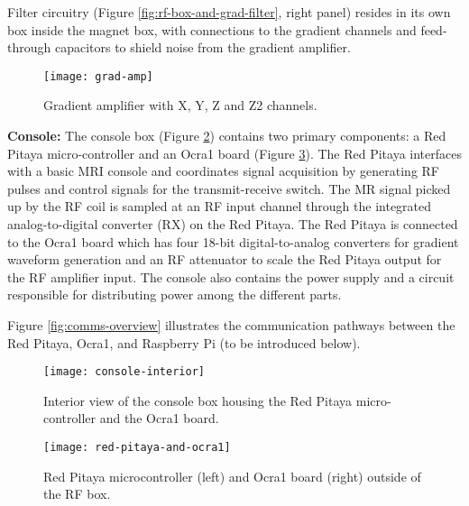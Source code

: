 Filter circuitry (Figure \ref{fig:rf-box-and-grad-filter}, right panel) resides in its own box inside the magnet box, with connections to the gradient channels and feed-through capacitors to shield noise from the gradient amplifier.

\begin{figure}[h]
    \centering
    \texttt{[image: grad-amp]}
    \captionsetup{width=.9\textwidth}
    \caption{\label{fig:grad-amp} Gradient amplifier with X, Y, Z and Z2 channels.}
    \vspace{-2mm}
\end{figure}

\vspace{5mm}

\noindent\textbf{Console:} The console box (Figure \ref{fig:console}) contains two primary components: a Red Pitaya micro-controller and an Ocra1 board (Figure \ref{fig:console-boards}). The Red Pitaya interfaces with a basic MRI console and coordinates signal acquisition by generating RF pulses and control signals for the transmit-receive switch. The MR signal picked up by the RF coil is sampled at an RF input channel through the integrated analog-to-digital converter (RX) on the Red Pitaya. The Red Pitaya is connected to the Ocra1 board which has four 18-bit digital-to-analog converters for gradient waveform generation and an RF attenuator to scale the Red Pitaya output for the RF amplifier input. The console also contains the power supply and a circuit responsible for distributing power among the different parts.

Figure \ref{fig:comms-overview} illustrates the communication pathways between the Red Pitaya, Ocra1, and Raspberry Pi (to be introduced below).

\begin{figure}[h]
    \centering
    \texttt{[image: console-interior]}
    \caption{\label{fig:console} Interior view of the console box housing the Red Pitaya micro-controller and the Ocra1 board.}
    \vspace{-5mm}
\end{figure}

\begin{figure}[h]
    \centering
    \texttt{[image: red-pitaya-and-ocra1]}
    \caption{\label{fig:console-boards} Red Pitaya microcontroller (left) and Ocra1 board (right) outside of the RF box.}
    \vspace{-5mm}
\end{figure}

